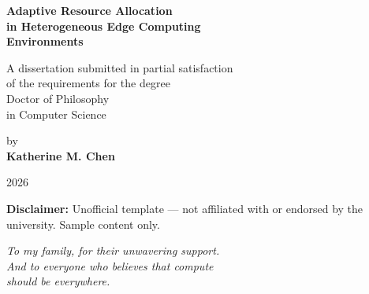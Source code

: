 \documentclass[12pt,oneside]{book}
\begin{document}
\begin{titlepage}
\thispagestyle{empty}
\singlespacing
\begin{center}

\vspace*{1.5in}

{\LARGE\bfseries\color{ucladark} Adaptive Resource Allocation\\[4pt]
in Heterogeneous Edge Computing\\[4pt]
Environments}

\vspace{0.8in}

{\large A dissertation submitted in partial satisfaction\\[4pt]
of the requirements for the degree\\[4pt]
Doctor of Philosophy\\[4pt]
in Computer Science}

\vspace{0.8in}

{\large by\\[4pt]
\textbf{Katherine M. Chen}}

\vspace{0.8in}

{\large 2026}

\vspace{1in}

\begin{tcolorbox}[
  colback=uclablue!5,
  colframe=uclablue!30,
  width=0.85\textwidth,
  center,
  boxrule=0.6pt,
  arc=3pt,
  before skip=0pt,
  after skip=0pt
]
\footnotesize\color{accentgray}
\textbf{Disclaimer:} Unofficial template --- not affiliated with or endorsed by
the university. Sample content only.
\end{tcolorbox}

\end{center}
\end{titlepage}

\thispagestyle{empty}
\vspace*{3in}
\begin{center}
\itshape To my family, for their unwavering support.\\[6pt]
And to everyone who believes that compute\\[4pt]
should be everywhere.
\end{center}













\end{document}
